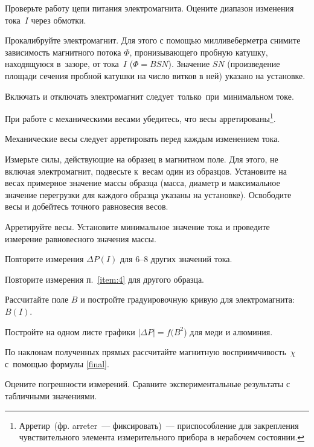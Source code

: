\begin{lab:task}



\item Проверьте работу цепи питания электромагнита. Оцените диапазон изменения
тока~$I$ через обмотки.

\item Прокалибруйте электромагнит. Для этого с помощью милливеберметра снимите
зависимость магнитного потока $\Phi$,
пронизывающего пробную катушку, находящуюся в~зазоре, от тока~$I$ ($\Phi=BSN$).
Значение $SN$ (произведение площади
сечения пробной катушки на число витков в ней) указано на установке.

\begin{lab:warning}
Включать и отключать электромагнит следует~только~при~минимальном токе.
\end{lab:warning}

\item При работе с механическими весами убедитесь,
что весы арретированы\footnote{Арретир~(фр. arreter~---
фиксировать)~--- приспособление для закрепления
чувствительного элемента измерительного прибора в нерабочем состоянии.}.

\begin{lab:warning}
Механические весы следует арретировать перед каждым изменением тока.
\end{lab:warning}

\item \label{item:4} Измерьте силы, действующие на образец в магнитном поле. Для
этого, не включая электромагнит, подвесьте к~весам
один из образцов. Установите на весах примерное значение массы образца (масса,
диаметр и максимальное значение
перегрузки для каждого образца указаны на установке). Освободите весы и
добейтесь точного равновесия весов.

Арретируйте весы. Установите минимальное значение тока и проведите измерение
равновесного значения массы.

Повторите измерения $\Delta P(I)$ для 6--8 других значений тока.

\item Повторите измерения п.~\ref{item:4} для другого образца.


	\item Рассчитайте поле $B$ и постройте градуировочную кривую для
электромагнита: $B(I)$.
	\item Постройте на одном листе графики $|\Delta P|=f(B^2$) для меди и
алюминия.
	\item По наклонам полученных прямых рассчитайте магнитную восприимчивость~$\chi$
    с~помощью формулы \eqref{final}.
	\item Оцените погрешности измерений. Сравните экспериментальные 
    результаты с табличными значениями.

\end{lab:task}


